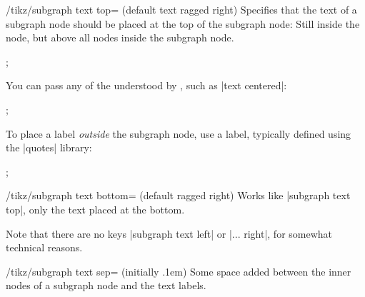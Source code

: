 \begin{key}{/tikz/subgraph text top= (default text ragged right)}
    Specifies that the text of a subgraph node should be placed at the top of
    the subgraph node: Still inside the node, but above all nodes inside the
    subgraph node.
\begin{codeexample}[preamble={\usetikzlibrary{graphs,graphdrawing}
\usegdlibrary{trees}}]
\tikz [subgraph text top=text ragged left]
  ;
\end{codeexample}
    You can pass any of the  understood by
    \tikzname, such as |text centered|:
\begin{codeexample}[
    width=5cm,
    preamble={\usetikzlibrary{graphs,graphdrawing}
\usegdlibrary{trees}},
]
\tikz [subgraph text top=text centered]
  ;
\end{codeexample}
    To place a label \emph{outside} the subgraph node, use a label, typically
    defined using the |quotes| library:
\begin{codeexample}[preamble={\usetikzlibrary{graphs,graphdrawing,quotes}
\usegdlibrary{trees}}]
\tikz {};
\end{codeexample}
\end{key}

\begin{key}{/tikz/subgraph text bottom= (default ragged right)}
    Works like |subgraph text top|, only the text placed at the bottom.
\end{key}

Note that there are no keys |subgraph text left| or |... right|, for somewhat
technical reasons.

\begin{key}{/tikz/subgraph text sep= (initially .1em)}
    Some space added between the inner nodes of a subgraph node and the text
    labels.
\end{key}


